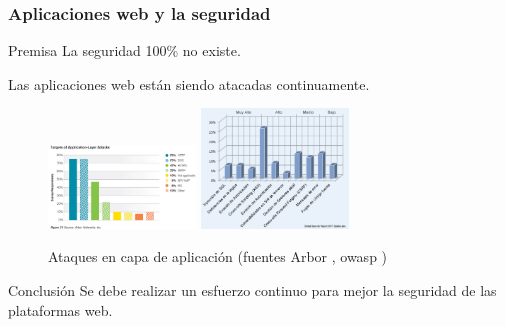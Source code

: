 \begin{frame}[shrink=10]
  \frametitle{Aplicaciones web y la seguridad}
  \begin{block}{Premisa}
     La seguridad 100\% no existe.
  \end{block}
  Las aplicaciones web están siendo atacadas continuamente.
  \begin{figure}
    \includegraphics[width=0.35\textwidth]{fig/application-attacks-2}%
    \qquad \includegraphics[width=0.35\textwidth]{fig/Vulnerabilidades_OWASP}
    \caption{\small{Ataques en capa de aplicación (fuentes Arbor \cite{articleArbor}, \acrshort{owasp} \cite{owasptop10})}}
    \label{fig:applicationattacks}
  \end{figure}
  \begin{alertblock}{Conclusión}
      Se debe realizar un esfuerzo continuo para mejor la seguridad de las plataformas web.
  \end{alertblock}
\end{frame}

